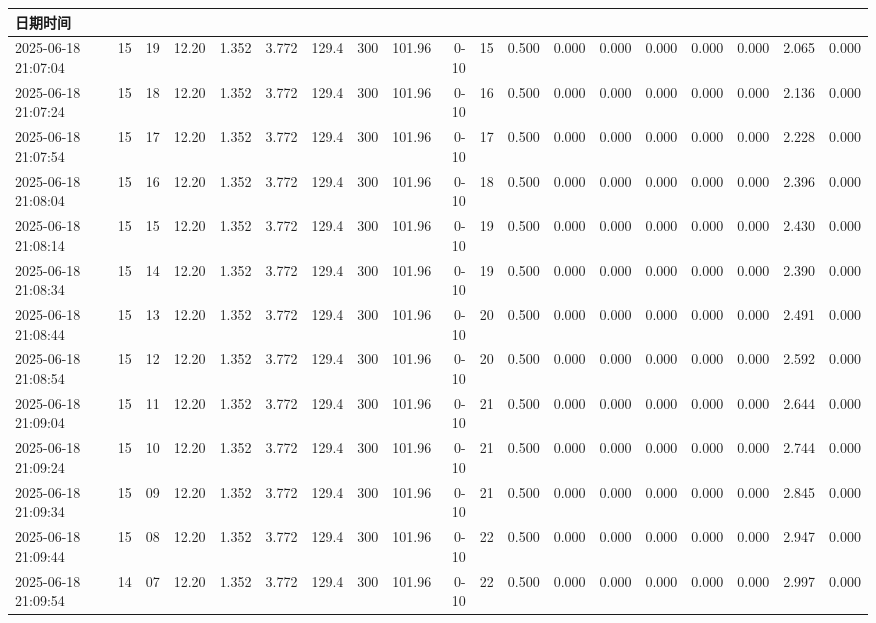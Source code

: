 \documentclass[UTF8,10pt,a4paper,fontset=fandol]{ctexart}
\begin{document}
\small
\begin{tabular}{|p{2.55cm}|r|r|r|r|r|r|r|r|r|r|r|r|r|r|r|r|r|r|}
\hline
日期时间 &  &  &  &  &  &  &  &  &  &  &  &  &  &  &  &  &  &  \\
\hline
2025-06-18 21:07:04 & 15 & 19 & 12.20 & 1.352 & 3.772 & 129.4 & 300 & 101.96 & 0-10 & 15 & 0.500 & 0.000 & 0.000 & 0.000 & 0.000 & 0.000 & 2.065 & 0.000 \\
2025-06-18 21:07:24 & 15 & 18 & 12.20 & 1.352 & 3.772 & 129.4 & 300 & 101.96 & 0-10 & 16 & 0.500 & 0.000 & 0.000 & 0.000 & 0.000 & 0.000 & 2.136 & 0.000 \\
2025-06-18 21:07:54 & 15 & 17 & 12.20 & 1.352 & 3.772 & 129.4 & 300 & 101.96 & 0-10 & 17 & 0.500 & 0.000 & 0.000 & 0.000 & 0.000 & 0.000 & 2.228 & 0.000 \\
2025-06-18 21:08:04 & 15 & 16 & 12.20 & 1.352 & 3.772 & 129.4 & 300 & 101.96 & 0-10 & 18 & 0.500 & 0.000 & 0.000 & 0.000 & 0.000 & 0.000 & 2.396 & 0.000 \\
2025-06-18 21:08:14 & 15 & 15 & 12.20 & 1.352 & 3.772 & 129.4 & 300 & 101.96 & 0-10 & 19 & 0.500 & 0.000 & 0.000 & 0.000 & 0.000 & 0.000 & 2.430 & 0.000 \\
2025-06-18 21:08:34 & 15 & 14 & 12.20 & 1.352 & 3.772 & 129.4 & 300 & 101.96 & 0-10 & 19 & 0.500 & 0.000 & 0.000 & 0.000 & 0.000 & 0.000 & 2.390 & 0.000 \\
2025-06-18 21:08:44 & 15 & 13 & 12.20 & 1.352 & 3.772 & 129.4 & 300 & 101.96 & 0-10 & 20 & 0.500 & 0.000 & 0.000 & 0.000 & 0.000 & 0.000 & 2.491 & 0.000 \\
2025-06-18 21:08:54 & 15 & 12 & 12.20 & 1.352 & 3.772 & 129.4 & 300 & 101.96 & 0-10 & 20 & 0.500 & 0.000 & 0.000 & 0.000 & 0.000 & 0.000 & 2.592 & 0.000 \\
2025-06-18 21:09:04 & 15 & 11 & 12.20 & 1.352 & 3.772 & 129.4 & 300 & 101.96 & 0-10 & 21 & 0.500 & 0.000 & 0.000 & 0.000 & 0.000 & 0.000 & 2.644 & 0.000 \\
2025-06-18 21:09:24 & 15 & 10 & 12.20 & 1.352 & 3.772 & 129.4 & 300 & 101.96 & 0-10 & 21 & 0.500 & 0.000 & 0.000 & 0.000 & 0.000 & 0.000 & 2.744 & 0.000 \\
2025-06-18 21:09:34 & 15 & 09 & 12.20 & 1.352 & 3.772 & 129.4 & 300 & 101.96 & 0-10 & 21 & 0.500 & 0.000 & 0.000 & 0.000 & 0.000 & 0.000 & 2.845 & 0.000 \\
2025-06-18 21:09:44 & 15 & 08 & 12.20 & 1.352 & 3.772 & 129.4 & 300 & 101.96 & 0-10 & 22 & 0.500 & 0.000 & 0.000 & 0.000 & 0.000 & 0.000 & 2.947 & 0.000 \\
2025-06-18 21:09:54 & 14 & 07 & 12.20 & 1.352 & 3.772 & 129.4 & 300 & 101.96 & 0-10 & 22 & 0.500 & 0.000 & 0.000 & 0.000 & 0.000 & 0.000 & 2.997 & 0.000 \\

\end{tabular}
\end{document}

